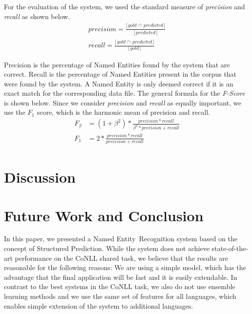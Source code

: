 \documentclass[11pt]{article}
\newcommand{\namedentity}{Named Entity}
\begin{document}
For the evaluation of the system, we used the standard measure of \emph{precision} and \emph{recall} as shown below.
\begin{align*}
     precision =  \frac{  |\,gold\,\cap\,predicted\,| }{ |\,predicted\,| } \\
     recall = \frac{ |\,gold\,\cap\,predicted\,| }{ |\,gold\,| }
\end{align*}

Precision is the percentage of Named Entities found by the system that are correct. Recall is the percentage of Named Entities present in the corpus that were 
found by the system. A Named Entity is only deemed correct if it is an exact match for the corresponding data file. The general formula for the \emph{F-Score} 
is shown below. Since we consider \emph{precision} and \emph{recall} as equally important, we use the $F_{1}$ score, which is the harmonic mean of precision and recall.
\begin{align*}
  F_{\beta} &=  (1+\beta^2)*\frac{precision *recall}{\beta^2* precision + recall}\\
  F_1       &= 2*\frac{precision *recall}{precision + recall}\\
\end{align*}





\section{Discussion}


\section{Future Work and Conclusion}

In this paper, we presented a \namedentity~Recognition system based on the concept of Structured Prediction. 
While the system does not achieve state-of-the-art performance on the CoNLL shared task, we believe that the results 
are reasonable for the following reasons: We are using a simple model, which has the advantage that the final application
will be fast and it is easily extendable. In contrast to the best systems in the CoNLL task, we also do not use ensemble 
learning methods and we use the same set of features for all languages, which enables simple extension of the system to additional languages.



 




\end{document}
